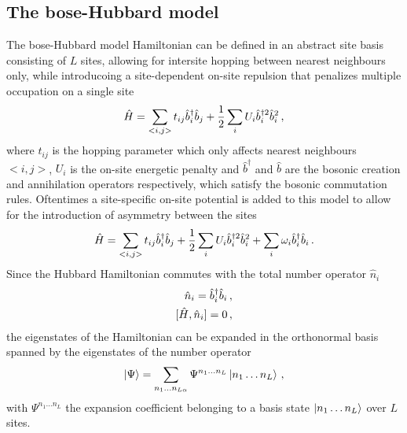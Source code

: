 \documentclass[twoside,twocolumn,9pt]{article}
\begin{document}
\subsection{The bose-Hubbard model}
The bose-Hubbard model Hamiltonian can be defined in an abstract site basis consisting of $L$ sites, allowing for intersite hopping between nearest neighbours only, while introducoing a site-dependent on-site repulsion that penalizes multiple occupation on a single site
\begin{equation}
  \hat{H} = \sum_{<i,j>} t_{ij}\hat{b}_i^\dagger \hat{b}_j + \frac{1}{2}\sum_i U_i\hat{b}_i^{\dagger 2} \hat{b}_i^{2} \thinspace ,
\end{equation}
where $t_{ij}$ is the hopping parameter which only affects nearest neighbours $<i,j>$, $U_i$ is the on-site energetic penalty and $\hat{b}^\dagger$ and $\hat{b}$ are the bosonic creation and annihilation operators respectively, which satisfy the bosonic commutation rules. Oftentimes a site-specific on-site potential is added to this model to allow for the introduction of asymmetry between the sites
\begin{equation}
  \hat{H} = \sum_{<i,j>} t_{ij}\hat{b}_i^\dagger \hat{b}_j + \frac{1}{2}\sum_i U_i\hat{b}_i^{\dagger 2} \hat{b}_i^{2} + \sum_i \omega_i \hat{b}_i^\dagger \hat{b}_i \thinspace .
  \label{eq:bose-hubbard-hamiltonian}
\end{equation}
Since the Hubbard Hamiltonian commutes with the total number operator $\hat{n}_i$
\begin{align}
  \hat{n}_i = \hat{b}_i^\dagger \hat{b}_i \thinspace &, \\
  [\hat{H}, \hat{n}_i] = 0 \thinspace &,
\end{align}
the eigenstates of the Hamiltonian can be expanded in the orthonormal basis spanned by the eigenstates of the number operator
\begin{equation}
    \ket{\Psi}=\sum_{n_{1}\dots n_{L\alpha}} 
    \Psi^{n_{1} \ldots n_{L}}
    \ket{n_{1}\dots n_{L}} 
    \thinspace ,
    \label{theory:eigenstate}
\end{equation}
with $\Psi^{n_{1} \ldots n_{L}}$ the expansion coefficient belonging to a basis state $\ket{n_{1}\dots n_{L}}$ over $L$ sites.
\end{document}

